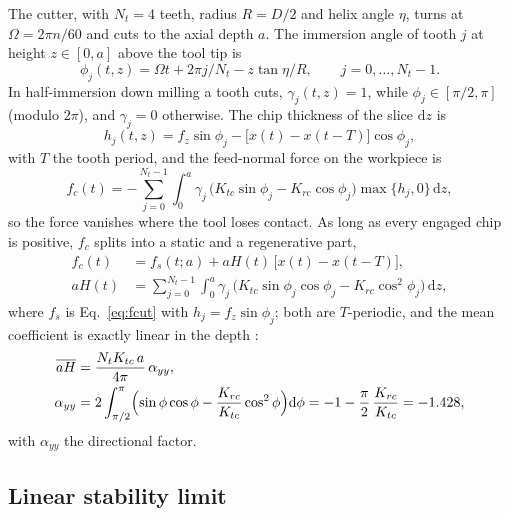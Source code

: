 The cutter, with $N_t=4$ teeth, radius $R=D/2$ and helix angle $\eta$, turns at $\Omega=2\pi n/60$ and cuts to the axial depth $a$. The immersion angle of tooth $j$ at height $z\in[0,a]$ above the tool tip is
\begin{equation}\label{eq:phi}
  \phi_j(t,z)=\Omega t+2\pi j/N_t-z\tan\eta/R ,\qquad j=0,\dots,N_t-1.
\end{equation}
In half-immersion down milling a tooth cuts, $\gamma_j(t,z)=1$, while $\phi_j\in[\pi/2,\pi]$ (modulo $2\pi$), and $\gamma_j=0$ otherwise. The chip thickness of the slice $\mathrm dz$ is
\begin{equation}\label{eq:chip}
  h_j(t,z)=f_z\sin\phi_j-\bigl[x(t)-x(t-T)\bigr]\cos\phi_j ,
\end{equation}
with $T$ the tooth period, and the feed-normal force on the workpiece is
\begin{equation}\label{eq:fcut}
  f_c(t)=-\sum_{j=0}^{N_t-1}\int_0^a\gamma_j\,\bigl(K_{tc}\sin\phi_j-K_{rc}\cos\phi_j\bigr)\max\{h_j,0\}\,\mathrm dz ,
\end{equation}
so the force vanishes where the tool loses contact. As long as every engaged chip is positive, $f_c$ splits into a static and a regenerative part,
\begin{align}
  f_c(t)&=f_s(t;a)+aH(t)\,\bigl[x(t)-x(t-T)\bigr],\label{eq:split}\\
  aH(t)&=\sum_{j=0}^{N_t-1}\int_0^a\gamma_j\,\bigl(K_{tc}\sin\phi_j\cos\phi_j-K_{rc}\cos^2\phi_j\bigr)\,\mathrm dz ,\label{eq:aHt}
\end{align}
where $f_s$ is Eq.~\eqref{eq:fcut} with $h_j=f_z\sin\phi_j$; both are $T$-periodic, and the mean coefficient is exactly linear in the depth \citep{altintas1995analytical}:
\begin{equation}\label{eq:aHmean}
  \begin{aligned}
    \overline{aH}&=\frac{N_tK_{tc}\,a}{4\pi}\,\alpha_{yy},\\
    \alpha_{yy}&=2\int_{\pi/2}^{\pi}\Bigl(\sin\phi\cos\phi-\frac{K_{rc}}{K_{tc}}\cos^2\phi\Bigr)\mathrm d\phi
    =-1-\frac{\pi}{2}\,\frac{K_{rc}}{K_{tc}}=-1.428 ,
  \end{aligned}
\end{equation}
with $\alpha_{yy}$ the directional factor.

\subsection{Linear stability limit}\label{sec:model-zoa}

